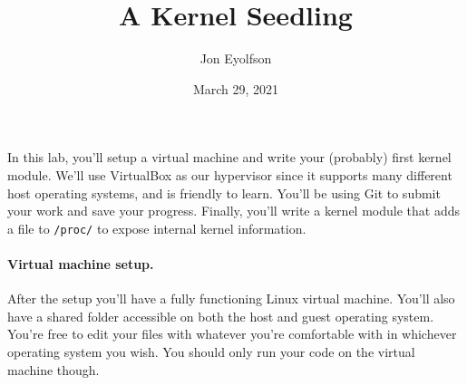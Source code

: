 

\title{A Kernel Seedling}
\author{Jon Eyolfson}
\date{March 29, 2021}



\maketitle

In this lab, you'll setup a virtual machine and write your (probably) first
kernel module.
We'll use VirtualBox as our hypervisor since it supports many different host
operating systems, and is friendly to learn.
You'll be using Git to submit your work and save your progress.
Finally, you'll write a kernel module that adds a file to \lstinline|/proc/|
to expose internal kernel information.

\paragraph{Virtual machine setup.}

After the setup you'll have a fully functioning Linux virtual machine.
You'll also have a shared folder accessible on both the host and guest operating
system.
You're free to edit your files with whatever you're comfortable with in
whichever operating system you wish.
You should only run your code on the virtual machine though.

